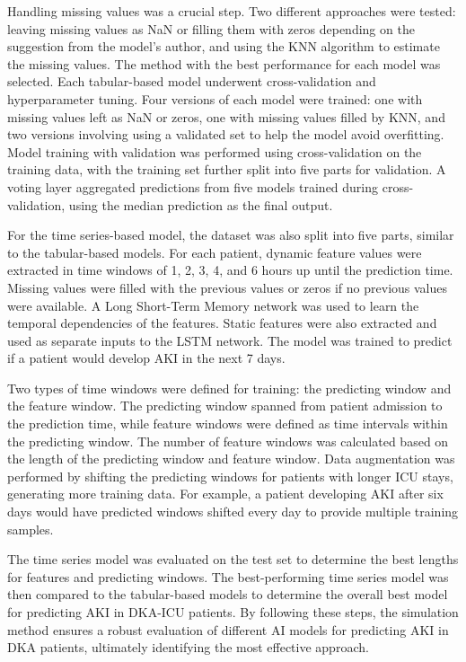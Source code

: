 \documentclass[sn-mathphys-num]{sn-jnl}%
\theoremstyle{thmstyleone}%
\theoremstyle{thmstyletwo}%
\theoremstyle{thmstylethree}%
\begin{document}
Handling missing values was a crucial step.
Two different approaches were tested: leaving missing values as NaN or filling them with zeros depending on the suggestion from the model's author, and using the KNN algorithm to estimate the missing values.
The method with the best performance for each model was selected.
Each tabular-based model underwent cross-validation and hyperparameter tuning.
Four versions of each model were trained: one with missing values left as NaN or zeros, one with missing values filled by KNN, and two versions involving using a validated set to help the model avoid overfitting.
Model training with validation was performed using cross-validation on the training data, with the training set further split into five parts for validation.
A voting layer aggregated predictions from five models trained during cross-validation, using the median prediction as the final output.

For the time series-based model, the dataset was also split into five parts, similar to the tabular-based models.
For each patient, dynamic feature values were extracted in time windows of 1, 2, 3, 4, and 6 hours up until the prediction time.
Missing values were filled with the previous values or zeros if no previous values were available.
A Long Short-Term Memory network was used to learn the temporal dependencies of the features.
Static features were also extracted and used as separate inputs to the LSTM network.
The model was trained to predict if a patient would develop AKI in the next 7 days.

Two types of time windows were defined for training: the predicting window and the feature window.
The predicting window spanned from patient admission to the prediction time, while feature windows were defined as time intervals within the predicting window.
The number of feature windows was calculated based on the length of the predicting window and feature window.
Data augmentation was performed by shifting the predicting windows for patients with longer ICU stays, generating more training data.
For example, a patient developing AKI after six days would have predicted windows shifted every day to provide multiple training samples.

The time series model was evaluated on the test set to determine the best lengths for features and predicting windows.
The best-performing time series model was then compared to the tabular-based models to determine the overall best model for predicting AKI in DKA-ICU patients.
By following these steps, the simulation method ensures a robust evaluation of different AI models for predicting AKI in DKA patients, ultimately identifying the most effective approach.
\end{document}
